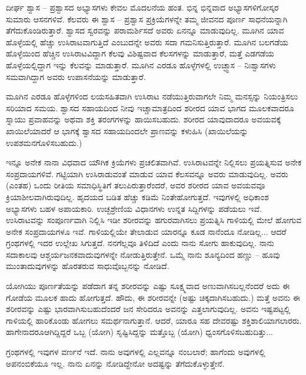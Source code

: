 \vskip 1.5pt

ದೀರ್ಘ ಶ್ವಾಸ – ಪ್ರಶ್ವಾಸದ ಅಭ್ಯಾಸಗಳು ಕೇವಲ ಮೊದಲನೆಯ ಹಂತ. ಭಿನ್ನ ಭಿನ್ನವಾದ ಅಭ್ಯಾಸಗಳಿಗೋಸ್ಕರ ಸುಮಾರು  ಆಸನಗಳಿವೆ. ಕೆಲವರು ಈ ಶ್ವಾಸ – ಪ್ರಶ್ವಾಸ ಪ್ರಕ್ರಿಯೆಗಳನ್ನೇ ತಮ್ಮ ಜೀವನದ ಪೂರ್ಣ ಸಾಧನೆಯನ್ನಾಗಿ ತೆಗೆದುಕೊಂಡಿರುತ್ತಾರೆ. ಶ್ವಾಸದ ಸ್ವರವನ್ನು ಪರಾಮರ್ಶಿಸದೆ ಅವರು ಏನನ್ನೂ ಮಾಡುವುದಿಲ್ಲ. ಮೂಗಿನ ಯಾವ ಹೊಳ್ಳೆಯಲ್ಲಿ ಹೆಚ್ಚು ಉಸಿರಾಟವಾಗುತ್ತಿದೆ ಎಂಬುದನ್ನೇ ಅವರು ಸದಾ ಗಮನಿಸುತ್ತಿರುತ್ತಾರೆ. ಮೂಗಿನ ಬಲಗಡೆಯ ಹೊಳ್ಳೆಯಿಂದ ಹೆಚ್ಚಿನ ಉಸಿರಾಟವಿದ್ದಾಗ ಕೆಲವು ವಿಶಿಷ್ಟವಾದ ಕೆಲಸಗಳನ್ನು ಮಾಡುತ್ತಾರೆ, ಮತ್ತೆ ಎಡಗಡೆಯ ಹೊಳ್ಳೆಯಲ್ಲಿದ್ದಾಗ ಇನ್ನು ಕೆಲವನ್ನು ಮಾಡುತ್ತಾರೆ. ಮೂಗಿನ ಎರಡೂ ಹೊಳ್ಳೆಗಳಲ್ಲಿ ಉಚ್ಛ್ವಾಸ – ನಿಃಶ್ವಾಸಗಳು ಸಮವಾಗಿದ್ದಾಗ ಅವರು ಉಪಾಸನೆಯನ್ನು ಮಾಡುತ್ತಾರೆ.

\vskip 1.5pt

ಮೂಗಿನ ಎರಡೂ ಹೊಳ್ಳೆಗಳಿಂದ ಲಯಸಹಿತವಾಗಿ ಉಸಿರಾಟ ನಡೆಯುತ್ತಿರುವಾಗಲೇ ನಿಮ್ಮ ಮನಸ್ಸನ್ನು ನಿಯಂತ್ರಿಸಲು ಸರಿಯಾದ ಸಮಯ. ಶ್ವಾಸದ ಸಹಾಯದಿಂದ ನೀವು ಇಚ್ಚಾಮಾತ್ರದಿಂದ ಶರೀರದ ಯಾವ ಭಾಗದ ಮೂಲಕವಾದರೂ ಸ್ನಾಯು ಪ್ರವಾಹವನ್ನು ಅಥವಾ ಶಕ್ತಿ ತರಂಗಗಳನ್ನು ಹಾಯಿಸಬಹುದು. ಶರೀರದ ಯಾವುದಾದರೂ ಅವಯವಕ್ಕೆ ಖಾಯಿಲೆಯಾದರೆ ಆ ಭಾಗಕ್ಕೆ ಶ್ವಾಸದ ಸಹಾಯದಿಂದಲೇ ಪ್ರಾಣವನ್ನು ಕಳುಹಿಸಿ (ಖಾಯಿಲೆಯನ್ನು ಉಪಶಮನಗೊಳಿಸಬಹುದು.)

\vskip 1.5pt

ಇನ್ನೂ ಅನೇಕ ನಾನಾ ವಿಧವಾದ ಯೌಗಿಕ ಕ್ರಿಯೆಗಳು ಪ್ರಚಲಿತವಾಗಿವೆ. ಉಸಿರಾಟವನ್ನೇ ನಿಲ್ಲಿಸಲು ಪ್ರಯತ್ನಿಸುವ ಅನೇಕ ಸಂಪ್ರದಾಯಗಳಿವೆ. ಗಟ್ಟಿಯಾಗಿ ಉಸಿರಾಡುವಂತೆ ಮಾಡುವ ಯಾವ ಕೆಲಸವನ್ನೂ ಅವರು ಮಾಡುವುದಿಲ್ಲ. ಅವರು (ಎಂತಹ) ಒಂದು ರೀತಿಯ ಸಮಾಧಿಸ್ಥಿತಿಗೆ ತಲುಪಿರುತ್ತಾರೆಂದರೆ, ಅವರ ಶರೀರದ ಯಾವ ಅವಯವವೂ ಕ್ರಿಯಾಶೀಲವಾಗಿರುವುದಿಲ್ಲ. ಹೃದಯದ ಬಡಿತ ಹೆಚ್ಚು ಕಡಿಮೆ ನಿಂತೇಹೋಗುತ್ತದೆ. ಇವುಗಳಲ್ಲಿ ಅಧಿಕಾಂಶ ಅಭ್ಯಾಸಗಳು ಬಹಳ ಅಪಾಯಕಾರಿ. ಉಚ್ಛಶ್ರೇಣಿಯ ವಿಧಾನಗಳು ಉನ್ನತ ಸಿದ್ದಿಗಳನ್ನು ಪಡೆಯಲು ಇವೆ. ಉಸಿರಾಟವನ್ನು ಸಂಪೂರ್ಣವಾಗಿ ನಿಲ್ಲಿಸಿ ಇಡೀ ಶರೀರವನ್ನು ಹಗುರವಾಗಿಸಲು ಪ್ರಯತ್ನಿಸಿ ಗಾಳಿಯಲ್ಲಿ ಮೇಲೆ ಹೋಗುವ ಅನೇಕ ಸಂಪ್ರದಾಯಗಳೂ ಇವೆ. ಗಾಳಿಯಲ್ಲಿಯೇ ತೇಲಾಡುವ ಯಾರನ್ನೂ ಕೂಡ ನಾನೆಂದೂ ನೋಡಿಲ್ಲ... ಆದರೆ ಗ್ರಂಥಗಳಲ್ಲಿ ಇದರ ಉಲ್ಲೇಖ ಸಿಗುತ್ತದೆ. ನನಗೆಲ್ಲವೂ ತಿಳಿದಿದೆ ಎಂದು ನಾನು ಸೋಗು ಹಾಕುವುದಿಲ್ಲ. ನಾನು ಸದಾಕಾಲವು ಆಶ್ಚರ್ಯಜನಕವಾದುವುಗಳನ್ನೇ ನೋಡುತ್ತಿರುತ್ತೇನೆ. ಒಮ್ಮೆ ನಾನು ಶೂನ್ಯದಿಂದ ಹಣ್ಣು – ಹೂವು ಮುಂತಾದುವುಗಳನ್ನು ಹೊರತರುವ ಸಾಧುವೊಬ್ಬನನ್ನು ನೋಡಿದೆ.

\vskip 1.5pt

ಯೋಗಿಯು ಪೂರ್ಣತೆಯನ್ನು ಪಡೆದಾಗ ತನ್ನ ಶರೀರವನ್ನು ಎಷ್ಟು ಸೂಕ್ಷ್ಮವಾದ ಅಣುವಾಗಿಸಬಲ್ಲನೆಂದರೆ ಅದು ಈ ಗೋಡೆಯ ಮೂಲಕ ಹಾದು ಹೋಗುತ್ತದೆ. ಹೌದು, ಈ ಶರೀರವನ್ನೇ (ಅಷ್ಟು ಚಿಕ್ಕದಾಗಿಸಬಹುದು.) ಮತ್ತೆ ಅವನು ಈ ಶರೀರವನ್ನು ಎಷ್ಟು ಭಾರವಾಗಿಸುಬಹುದೆಂದರೆ  ಜನ ಸೇರಿದರೂ ಅವನನ್ನು ಎತ್ತಲಾಗುವುದಿಲ್ಲ. ಅವನು ಇಷ್ಟಪಟ್ಟಲ್ಲಿ ಗಾಳಿಯಲ್ಲಿ ಹಾರಿಕೊಂಡು ಹೋಗಲು ಸಮರ್ಥನಾಗುತ್ತಾನೆ. ಆದರೆ, ಯಾರೂ ಸಹ ದೇವರಷ್ಟು ಶಕ್ತಿಶಾಲಿಯಾಗಲಾರರು. ಹಾಗೇನಾದರೂ\break ಆಗಿದ್ದಿದ್ದರೆ ಒಬ್ಬ (ಯೋಗಿ) ಸೃಷ್ಟಿಸಿದ್ದನ್ನು ಮತ್ತೊಬ್ಬ (ಯೋಗಿ) ಧ್ವಂಸಗೊಳಿಸಬಹುದಿತ್ತು...

\vskip 1.5pt

ಗ್ರಂಥಗಳಲ್ಲಿ ಇವುಗಳ ವರ್ಣನೆ ಇದೆ. ನಾನು ಅವುಗಳಲ್ಲಿ ಎಲ್ಲವನ್ನೂ ನಂಬಲಾರೆ; ಹಾಗೆಂದು ಅವುಗಳಲ್ಲಿ ಅಪನಂಬಿಕೆಯೂ ಇಲ್ಲ. ನಾನು ಏನನ್ನು ನೋಡಿದ್ದೇನೋ ಅದಷ್ಟನ್ನು ತೆಗೆದುಕೊಳ್ಳುತ್ತೇನೆ.

